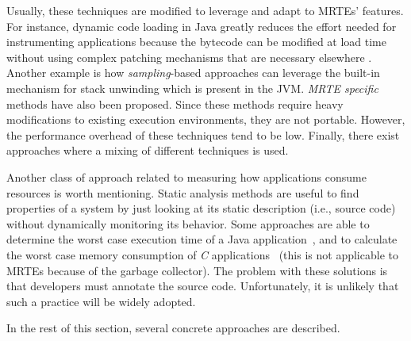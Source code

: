 Usually, these techniques are modified to leverage and adapt to MRTEs' features.
For instance, dynamic code loading in Java greatly reduces the effort needed for instrumenting applications because the bytecode can be modified at load time without using complex patching mechanisms that are necessary elsewhere \cite{Gregg:2011:DDT:1971960}.
Another example is how \textit{sampling}-based approaches can leverage the built-in mechanism for stack unwinding which is present in the JVM.
\textit{MRTE specific} methods have also been proposed.
Since these methods require heavy modifications to existing execution environments, they are not portable.
However, the performance overhead of these techniques tend to be low.
Finally, there exist approaches where a mixing of different techniques is used.

Another class of approach related to measuring how applications consume resources is worth mentioning.
Static analysis methods are useful to find properties of a system by just looking at its static description (i.e., source code) without dynamically monitoring its behavior.
Some approaches are able to determine the worst case execution time of a Java application~\cite{Schoeberl:2010:WET:1780354.1780356}, and to calculate the worst case memory consumption of \textit{C} applications~\cite{Puffitsch:2010:WAH:1939345.1939394} (this is not applicable to MRTEs because of the garbage collector).
The problem with these solutions is that developers must annotate the source code.
Unfortunately, it is unlikely that such a practice will be widely adopted.

In the rest of this section, several concrete approaches are described.


